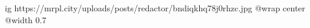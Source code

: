  
 
 
 
 

\ifcmt
  ig https://mrpl.city/uploads/posts/redactor/bndiqkhq78j0rhzc.jpg
  @wrap center
  @width 0.7
\fi
